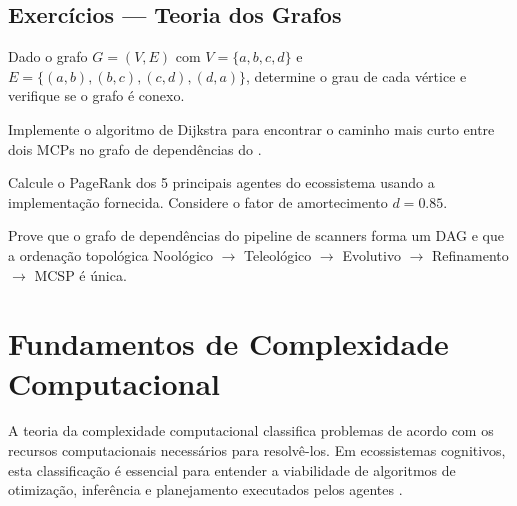 \subsection{Exercícios — Teoria dos Grafos}
\begin{exercicio}
Dado o grafo $G = (V, E)$ com $V = \{a, b, c, d\}$ e
$E = \{(a,b), (b,c), (c,d), (d,a)\}$, determine o grau de cada vértice
e verifique se o grafo é conexo.
\end{exercicio}
\begin{exercicio}
Implemente o algoritmo de Dijkstra para encontrar o caminho mais curto
entre dois MCPs no grafo de dependências do \opencodeeco{}.
\end{exercicio}
\begin{exercicio}
Calcule o PageRank dos 5 principais agentes do ecossistema usando a
implementação fornecida. Considere o fator de amortecimento $d = 0.85$.
\end{exercicio}
\begin{exercicio}
Prove que o grafo de dependências do pipeline de scanners forma um DAG
e que a ordenação topológica Noológico $\to$ Teleológico $\to$ Evolutivo
$\to$ Refinamento $\to$ MCSP é única.
\end{exercicio}
\section{Fundamentos de Complexidade Computacional}
\label{sec:complexidade}
\nivelphd
A teoria da complexidade computacional classifica problemas de acordo com
os recursos computacionais necessários para resolvê-los. Em ecossistemas
cognitivos, esta classificação é essencial para entender a viabilidade de
algoritmos de otimização, inferência e planejamento executados pelos agentes
\cite{russell2020inteligencia, wooldridge2009multiagent}.
